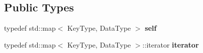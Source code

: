 \subsection*{Public Types}
\begin{DoxyCompactItemize}
\item 
\mbox{\label{classez_1_1objects_1_1Mapping_a990b23e3d9619eaa026247d0dee44076}} 
typedef std\+::map$<$ Key\+Type, Data\+Type $>$ {\bfseries self}
\item 
\mbox{\label{classez_1_1objects_1_1Mapping_a1a0dde6f2975df504001a30fa4354387}} 
typedef std\+::map$<$ Key\+Type, Data\+Type $>$\+::iterator {\bfseries iterator}
\end{DoxyCompactItemize}
